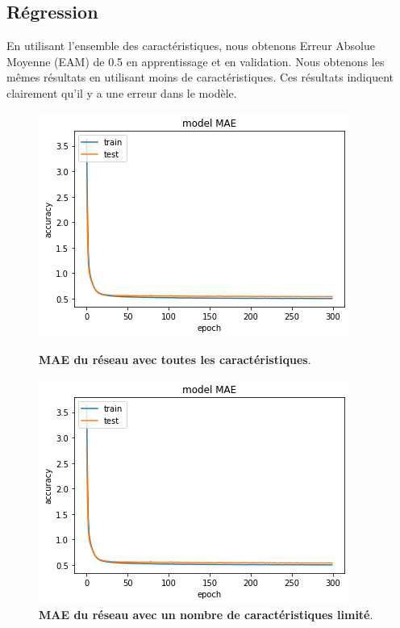 \subsection*{Régression}
\label{sec:regression}

En utilisant l'ensemble des caractéristiques, nous obtenons Erreur Absolue Moyenne (EAM) de 0.5 en apprentissage et en validation.
Nous obtenons les mêmes résultats en utilisant moins de caractéristiques. Ces résultats indiquent clairement qu'il y a une erreur dans le modèle.

\begin{figure}[ht]
	\centering
	\begin{minipage}[t]{0.48\textwidth}
		\centering
		\includegraphics[scale=0.50]{../images/vins_blancs/full_reg_mae_white.png}
		\caption[MAE du réseau]{\textbf{MAE du réseau avec toutes les caractéristiques}.}
		\label{fig:full-reg-mae-white}
	\end{minipage}\hfill
	\begin{minipage}[t]{0.48\textwidth}
		\centering
		\includegraphics[scale=0.50]{../images/vins_blancs/full_reg_mae_white.png}
		\caption[MAE du réseau]{\textbf{MAE du réseau avec un nombre de caractéristiques limité}.}
		\label{fig:small-reg-mae-white}
	\end{minipage}
\end{figure}